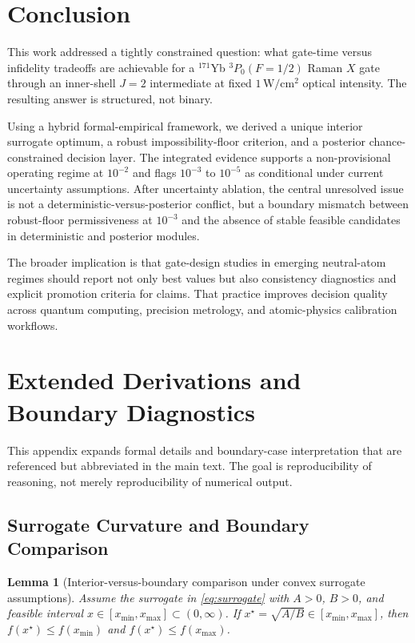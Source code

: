 \documentclass{article} %
\newtheorem{lemma}[theorem]{Lemma}
\begin{document}
\section{Conclusion}
\label{sec:conclusion}
This work addressed a tightly constrained question: what gate-time versus infidelity tradeoffs are achievable for a $^{171}$Yb $^3P_0(F=1/2)$ Raman $X$ gate through an inner-shell $J=2$ intermediate at fixed $1\,\mathrm{W/cm^2}$ optical intensity. The resulting answer is structured, not binary.

Using a hybrid formal-empirical framework, we derived a unique interior surrogate optimum, a robust impossibility-floor criterion, and a posterior chance-constrained decision layer. The integrated evidence supports a non-provisional operating regime at $10^{-2}$ and flags $10^{-3}$ to $10^{-5}$ as conditional under current uncertainty assumptions. After uncertainty ablation, the central unresolved issue is not a deterministic-versus-posterior conflict, but a boundary mismatch between robust-floor permissiveness at $10^{-3}$ and the absence of stable feasible candidates in deterministic and posterior modules.

The broader implication is that gate-design studies in emerging neutral-atom regimes should report not only best values but also consistency diagnostics and explicit promotion criteria for claims. That practice improves decision quality across quantum computing, precision metrology, and atomic-physics calibration workflows.






\appendix
\section{Extended Derivations and Boundary Diagnostics}
\label{sec:appendix_deriv}
This appendix expands formal details and boundary-case interpretation that are referenced but abbreviated in the main text. The goal is reproducibility of reasoning, not merely reproducibility of numerical output.

\subsection{Surrogate Curvature and Boundary Comparison}
\begin{lemma}[Interior-versus-boundary comparison under convex surrogate assumptions]
\label{lem:boundary}
Assume the surrogate in \eqref{eq:surrogate} with $A>0$, $B>0$, and feasible interval $x\in[x_{\min},x_{\max}]\subset(0,\infty)$. If $x^{\star}=\sqrt{A/B}\in[x_{\min},x_{\max}]$, then $f(x^{\star})\le f(x_{\min})$ and $f(x^{\star})\le f(x_{\max})$.
\end{lemma}
\end{document}
